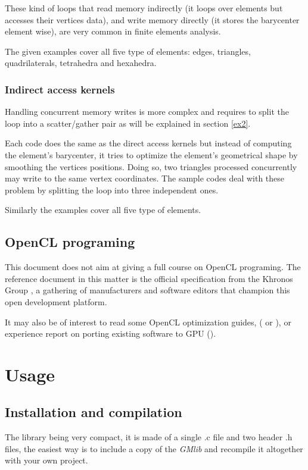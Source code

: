 \documentclass[a4paper,12pt]{article}
\begin{document}
These kind of loops that read memory indirectly (it loops over elements but accesses their vertices data), and write memory directly (it stores the barycenter element wise), are very common in finite elements analysis.

The given examples cover all five type of elements: edges, triangles, quadrilaterals, tetrahedra and hexahedra.

\subsubsection*{Indirect access kernels}
Handling concurrent memory writes is more complex and requires to split the loop into a scatter/gather pair as will be explained in section \ref{ex2}.

Each code does the same as the direct access kernels but instead of computing the element's barycenter, it tries to optimize the element's geometrical shape by smoothing the vertices positions. Doing so, two triangles processed concurrently may write to the same vertex coordinates. The sample codes deal with these problem by splitting the loop into three independent ones.

Similarly the examples cover all five type of elements.


\subsection{OpenCL programing}
This document does not aim at giving a full course on OpenCL programing. The reference document in this matter is the official specification from the Khronos Group \cite{khronos}, a gathering of manufacturers and software editors that champion this open development platform.

It may also be of interest to read some OpenCL optimization guides, (\cite{nvidia} or \cite{apple}), or experience report on porting existing software to GPU (\cite{lohner}).


%
%

\section{Usage}
\label{util}
\subsection{Installation and compilation}
The library being very compact, it is made of a single .c file and two header .h files, the easiest way is to include a copy of the \emph{GMlib} and recompile it altogether with your own project.
\end{document}
